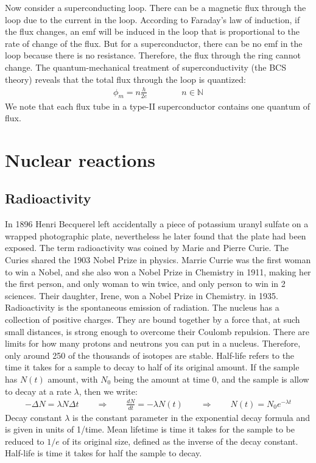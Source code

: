 \documentclass[11pt]{article}
\theoremstyle{break}
\theoremstyle{break}
\newcommand{\N}{\mathbb{N}}
\begin{document}
Now consider a superconducting loop. There can be a magnetic flux through the loop due to the current in the loop. 
According to Faraday's law of induction, if the flux changes, an emf will be induced in the loop that is proportional to the rate of change of the flux. But for a superconductor, there can be no emf in the loop because there is no resistance. 
Therefore, the flux through the ring cannot change. The quantum-mechanical treatment of superconductivity (the BCS theory) reveals that the total flux through the loop is quantized:
\begin{align*}
\phi_m  = n\frac{h}{2e}\qquad\qquad n \in \N
\end{align*}
We note that each flux tube in a type-II superconductor contains one quantum of flux.\\


\newpage
\section{Nuclear reactions}
\subsection{Radioactivity}
In 1896 Henri Becquerel left accidentally a piece of potassium uranyl sulfate on a wrapped photographic plate, nevertheless he later found that the plate had been exposed. The term radioactivity was coined by Marie and Pierre Curie. The Curies shared the 1903 Nobel Prize in physics. Marrie Currie was the first woman to win a Nobel, and she also won a Nobel Prize in Chemistry in 1911, making her the first person, and only woman to win twice, and only person to win in 2 sciences. Their daughter, Irene, won a Nobel Prize in Chemistry. in 1935. \\

Radioactivity is the spontaneous emission of radiation. The nucleus has a collection of positive charges. They are bound together by a force that, at such small distances, is strong enough to overcome their Coulomb repulsion. There are limits for how many protons and neutrons you can put in a nucleus. Therefore, only around 250 of the thousands of isotopes are stable. Half-life refers to the time it takes for a sample to decay to half of its original amount. If the sample has $N(t)$ amount, with $N_0$ being the amount at time $0$, and the sample is allow to decay at a rate $\lambda$, then we write:
\begin{align*}
-\Delta N = \lambda N \Delta t \qquad \Rightarrow \qquad \frac{dN}{dt} = -\lambda N(t) \qquad \Rightarrow \qquad N(t) = N_0e^{-\lambda t}
\end{align*}
Decay constant $\lambda$ is the constant parameter in the exponential decay formula and is given in units of 1/time. Mean lifetime is time it takes for the sample to be reduced to $1/e$ of its original size, defined as the inverse of the decay constant. Half-life is time it takes for half the sample to decay. \\
\end{document}
